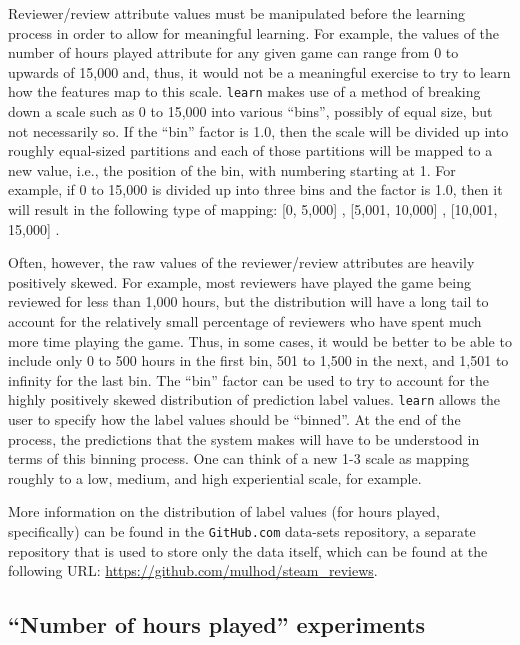\documentclass[9pt]{article}
\begin{document}
Reviewer/review attribute values must be manipulated before the learning process in order to allow for meaningful learning. For example, the values of the number of hours played attribute for any given game can range from 0 to upwards of 15,000 and, thus, it would not be a meaningful exercise to try to learn how the features map to this scale. {\tt learn} makes use of a method of breaking down a scale such as 0 to 15,000 into various ``bins'', possibly of equal size, but not necessarily so. If the ``bin'' factor is 1.0, then the scale will be divided up into roughly equal-sized partitions and each of those partitions will be mapped to a new value, i.e., the position of the bin, with numbering starting at 1. For example, if 0 to 15,000 is divided up into three bins and the factor is 1.0, then it will result in the following type of mapping: [0, 5,000] , [5,001, 10,000] , [10,001, 15,000] .

Often, however, the raw values of the reviewer/review attributes are heavily positively skewed. For example, most reviewers have played the game being reviewed for less than 1,000 hours, but the distribution will have a long tail to account for the relatively small percentage of reviewers who have spent much more time playing the game. Thus, in some cases, it would be better to be able to include only 0 to 500 hours in the first bin, 501 to 1,500 in the next, and 1,501 to infinity for the last bin. The ``bin'' factor can be used to try to account for the highly positively skewed distribution of prediction label values. {\tt learn} allows the user to specify how the label values should be ``binned''. At the end of the process, the predictions that the system makes will have to be understood in terms of this binning process. One can think of a new 1-3 scale as mapping roughly to a low, medium, and high experiential scale, for example.

More information on the distribution of label values (for hours played, specifically) can be found in the {\tt GitHub.com} data-sets repository, a separate repository that is used to store only the data itself, which can be found at the following URL: \url{https://github.com/mulhod/steam_reviews}.

\subsection{``Number of hours played'' experiments}
\label{ssec:hours_played}
\end{document}
